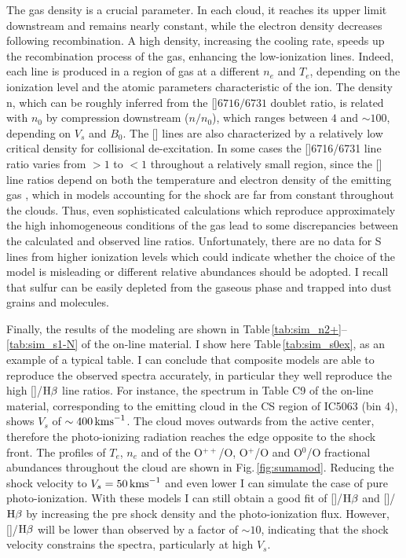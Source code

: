 \documentclass[../main.tex]{subfiles}
\begin{document}
The gas density is a crucial parameter. 
In each cloud, it reaches its upper limit downstream and remains nearly constant, while the electron density decreases following recombination. 
A high density, increasing the cooling rate, speeds up the recombination process of the gas, enhancing the low-ionization lines.
Indeed, each line is produced in a region of gas at a different $n_e$ and $T_e$, depending on the ionization level and the atomic parameters characteristic of the ion. 
The density n, which can be roughly inferred from the []$6716/6731$ doublet ratio, is related with $n_0$ by compression downstream ($n/n_0$), which ranges between $4$ and $\sim100$, depending on $V_s$ and $B_0$. 
The [] lines are also characterized by a relatively low critical density for collisional de-excitation.  
In some cases the []6716/6731 line ratio varies from $> 1$ to $< 1$ throughout a relatively small region, since the [] line ratios depend on both the temperature and electron density of the emitting gas \citep{OsterbrockAGN}, which in models accounting for the shock are far from constant throughout the clouds.
Thus, even sophisticated calculations which reproduce approximately the high inhomogeneous conditions of the gas
lead to some discrepancies between the calculated and observed line ratios.
Unfortunately, there are no data for S lines from higher ionization levels which could indicate whether the choice of the model is misleading or different relative abundances should be adopted. 
I recall that sulfur can be easily depleted from the gaseous phase and trapped into dust grains and molecules.

Finally, the results of the modeling are shown in Table\,\ref{tab:sim_n2+}--\ref{tab:sim_s1-N} of the on-line material.
I show here Table\,\ref{tab:sim_s0ex}, as an example of a typical table. 
I can conclude that composite models are able to reproduce the observed spectra accurately, in particular they well reproduce the high []/$\Hb$ line ratios.
For instance, the spectrum in Table C9 of the on-line material, corresponding to the emitting cloud in the CS region of IC5063 (bin 4), shows $V_s$ of $\sim 400\,\si{\kms}$. 
The cloud moves outwards from the active center, therefore the photo-ionizing radiation reaches the edge opposite to the shock front.
The profiles of $T_e$, $n_e$ and of the O$^{++}$/O, O$^+$/O and O$^0$/O fractional abundances throughout the cloud are shown in Fig.\,\ref{fig:sumamod}.
Reducing the shock velocity to $V_s =50\,\si{\kms}$ and even lower I can simulate the case of pure photo-ionization.
With these models I can still obtain a good fit of []/$\Hb$ and []/$\Hb$ by increasing the pre shock density and the photo-ionization flux.
However,  []/$\Hb$  will be lower than observed by a factor of $\sim 10$, indicating that the shock velocity constrains the spectra, particularly at high $V_s$.
\end{document}

